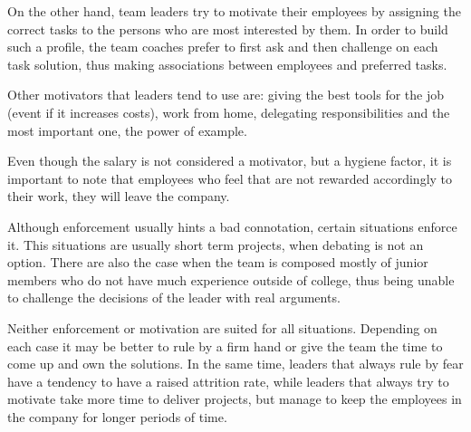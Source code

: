 On the other hand, team leaders try to motivate their employees by assigning the correct tasks to the persons who are most interested by them. In order to build such a profile, the team coaches prefer to first ask and then challenge on each task solution, thus making associations between employees and preferred tasks.

Other motivators that leaders tend to use are: giving the best tools for the job (event if it increases costs), work from home, delegating responsibilities and the most important one, the power of example.

Even though the salary is not considered a motivator, but a hygiene factor, it is important to note that employees who feel that are not rewarded accordingly to their work, they will leave the company. 

Although enforcement usually hints a bad connotation, certain situations enforce it. This situations are usually short term projects, when debating is not an option. There are also the case when the team is composed mostly of junior members who do not have much experience outside of college, thus being unable to challenge the decisions of the leader with real arguments. 

Neither enforcement or motivation are suited for all situations. Depending on each case it may be better to rule by a firm hand or give the team the time to come up and own the solutions. In the same time, leaders that always rule by fear have a tendency to have a raised attrition rate, while leaders that always try to motivate take more time to deliver projects, but manage to keep the employees in the company for longer periods of time.